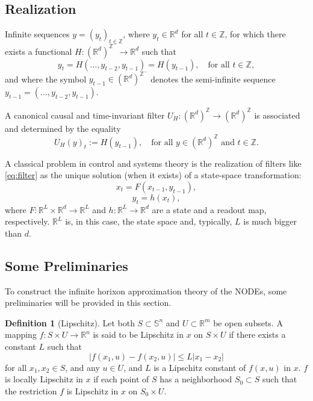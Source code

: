 \documentclass{article}
\theoremstyle{definition}
\newtheorem{definition}{Definition}
\theoremstyle{remark}
\newcounter{ct}
\begin{document}
\subsection{Realization}\label{sec:realization}

Infinite sequences \( y = (y_t)_{t \in \mathbb{Z}} \), where \( y_t \in \mathbb{R}^d \) for all \( t \in \mathbb{Z} \), for which there exists a functional \( H : (\mathbb{R}^d)^{\mathbb{Z}^-} \rightarrow \mathbb{R}^d \) such that 
\begin{equation}\label{eq:filter}
y_t = H(\ldots, y_{t-2}, y_{t-1}) = H\left( y_{t-1} \right), \quad \text{for all } t \in \mathbb{Z},
\end{equation}
and where the symbol \( y_{t-1} \in (\mathbb{R}^d)^{\mathbb{Z}^-} \) denotes the semi-infinite sequence \( y_{t-1} = (\ldots, y_{t-2}, y_{t-1}) \).

A canonical causal and time-invariant filter \( U_H : (\mathbb{R}^d)^{\mathbb{Z}} \rightarrow (\mathbb{R}^d)^{\mathbb{Z}} \) is associated and determined by the equality 
\[
U_H(y)_t := H\left( y_{t-1} \right), \quad \text{for all } y \in (\mathbb{R}^d)^{\mathbb{Z}} \text{ and } t \in \mathbb{Z}.
\]

A classical problem in control and systems theory is the realization of filters like \ref{eq:filter} as the unique solution (when it exists) of a state-space transformation:
\begin{equation}
x_t = F(x_{t-1}, y_{t-1}),
\end{equation}
\begin{equation}
y_t = h(x_t),
\end{equation}
where \( F : \mathbb{R}^L \times \mathbb{R}^d \rightarrow \mathbb{R}^L \) and \( h : \mathbb{R}^L \rightarrow \mathbb{R}^d \) are a state and a readout map, respectively. \( \mathbb{R}^L \) is, in this case, the state space and, typically, \( L \) is much bigger than \( d \).

\subsection{Some Preliminaries}
To construct the infinite horixon approximation theory of the NODEs, some preliminaries will be provided in this section.

\begin{definition}[Lipschitz]
 Let both $S \subset \mathbb{S}^n$ and $U \subset \mathbb{R}^m$ be open subsets.
 A mapping $f: S \times U \rightarrow \mathbb{R}^n$ is said to be Lipschitz in $x$ on $S \times U$ if there exists a constant $L$ such that
\[
|f(x_1, u) - f(x_2, u)| \leq L |x_1 - x_2|
\]
for all $x_1, x_2 \in S$, and any $u \in U$, and $L$ is a Lipschitz constant of $f(x, u)$ in $x$. $f$ is locally Lipschitz in $x$ if each point of $S$ has a neighborhood $S_0 \subset S$ such that the restriction $f$ is Lipschitz in $x$ on $S_0 \times U$.
\end{definition}
\end{document}
